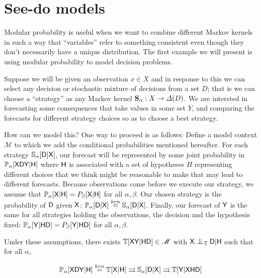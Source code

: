 
\section{See-do models}\label{sec:seedo_models}

Modular probability is useful when we want to combine different Markov kernels in such a way that ``variables'' refer to something consistent even though they don't necessarily have a unique distribution. The first example we will present is using modular probability to model decision problems.

Suppose we will be given an observation $x\in X$ and in response to this we can select any decision or stochastic mixture of decisions from a set $D$; that is we can choose a ``strategy'' as any Markov kernel $\mathbf{S}_\alpha:X\to \Delta(D)$. We are intersted in forecasting some consequences that take values in some set $Y$, and comparing the forecasts for different strategy choices so as to choose a best strategy.

How can we model this? One way to proceed is as follows: Define a model context $\mathscr{M}$ to which we add the conditional probabilities mentioned hereafter. For each strategy $\mathbb{S}_\alpha[\mathsf{D}|\mathsf{X}]$, our forecast will be represented by some joint probability in $\mathbb{P}_{\alpha}[\mathsf{X}\mathsf{D}\mathsf{Y}|\mathsf{H}]$ where $\mathsf{H}$ is associated with a set of hypotheses $H$ representing different choices that we think might be reasonable to make that may lead to different forecasts. Because observations come before we execute our strategy, we assume that $\mathbb{P}_{\alpha}[\mathsf{X}|\mathsf{H}]=P_{\beta}[\mathsf{X}|\mathsf{H}]$ for all $\alpha,\beta$. Our chosen strategy is the probability of $\mathsf{D}$ given $\mathsf{X}$: $\mathbb{P}_{\alpha}[\mathsf{D}|\mathsf{X}]\overset{krn}{=}\mathbb{S}_\alpha[\mathsf{D}|\mathsf{X}]$. Finally, our forecast of $\mathsf{Y}$ is the same for all strategies holding the observations, the decision and the hypothesis fixed: $\mathbb{P}_{\alpha}[\mathsf{Y}|\mathsf{HD}]=P_{\beta}[\mathsf{Y}|\mathsf{HD}]$ for all $\alpha,\beta$.

Under these assumptions, there exists $\mathbb{T}[\mathsf{X}\mathsf{Y}|\mathsf{HD}]\in \mathscr{M}$ with $\RV{X}\CI_{\model{T}}\RV{D}|\RV{H}$ such that for all $\alpha$, 

\begin{align}
    \mathbb{P}_{\alpha}[\mathsf{X}\mathsf{D}\mathsf{Y}|\mathsf{H}]\overset{krn}{=}\mathbb{T}[\mathsf{X}|\mathsf{H}]\rightrightarrows \mathbb{S}_\alpha [\mathsf{D}|\mathsf{X}] \rightrightarrows \mathbb{T}[\mathsf{Y}|\mathsf{XHD}] \label{eq:see_do_query}
\end{align}

